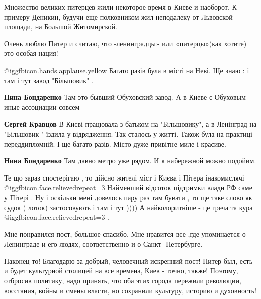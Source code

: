 \begin{itemize}
\begin{itemize}
\end{itemize} %


Множество великих питерцев жили некоторое время в Киеве и наоборот. К примеру
Деникин, будучи еще полковником жил неподалеку от Львовской площади, на Большой
Житомирской.


Очень люблю Питер и считаю, что -ленинградцы» или «питерцы»(как хотите) это
особая нация!


@igg{fbicon.hands.applause.yellow}  Багато разів була в місті на Неві. Ще знаю
: і там і тут завод "Більшовик" .

\begin{itemize} %
\textbf{Нина Бондаренко} Там это бывший Обуховский завод. А в Киеве с Обуховым иные ассоциации совсем

\textbf{Сергей Кравцов} В Києві працювала з батьком на "Більшовику", а в Ленінград на
"Більшовик " їздила у відрядження. Так сталось у житті. Також була на практиці переддипломній. І ще багато разів. Місто дуже привітне миле і красиве.

\textbf{Нина Бондаренко} Там давно метро уже рядом. И к набережной можно подойим.
\end{itemize} %


Те що зараз спостерігаю , то дійсно жителі міст і Києва і Пітера інакомислячі
 @igg{fbicon.face.relieved}{repeat=3}  Найменший відсоток підтримки влади РФ саме у Пітері . Ну і оскільки мені
довелось пару раз там бувати , то ще таке слово як судок ( лоток) застосовують
і там і тут )))) А найколоритніше - це греча та кура  @igg{fbicon.face.relieved}{repeat=3} .


Мне понравился пост, большое спасибо. Мне нравится все ,где упоминается о
Ленинграде и его людях, соответственно и о Санкт- Петербурге.


Наконец то! Благодарю за добрый, человечный искренний пост! Питер был, есть и
будет культурной столицей на все времена, Киев - точно, также! Поэтому,
отбросив политику, надо принять, что оба этих города пережили революции,
восстания, войны и смены власти, но сохранили культуру, историю и духовность!


\end{itemize}
